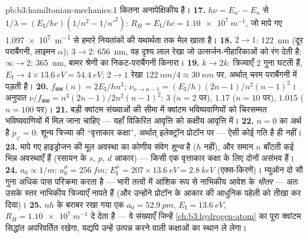 \begin{solution}{pb:b3:hamiltonian-mechanics:1}
कितना अनापेक्षिकीय है।
\textbf{17.} $h\nu = E_{n'} - E_n$ से $1/\lambda =
(E_{\text{I}}/hc)(1/n^2 - 1/n'^2)$: $R_H = E_{\text{I}}/hc =
\qty{1.10e7}{m^{-1}}$, जो मापे गए \qty{1.097e7}{m^{-1}} से हमारे
नियतांकों की यथार्थता तक मेल खाता है।
\textbf{18.} $2 \to 1$: \qty{122}{nm} (दूर पराबैंगनी, लाइमन
$\alpha$); $3 \to 2$: \qty{656}{nm}, वह दृश्य लाल रेखा जो
उत्सर्जन-नीहारिकाओं को रंग देती है; $\infty \to 2$: \qty{365}{nm},
बामर श्रेणी का निकट-पराबैंगनी किनारा।
\textbf{19.} $k \to 2k$: त्रिज्याएँ $2$ गुना घटती हैं, $E_{\text{I}} \to
4 \times \qty{13.6}{eV} = \qty{54.4}{eV}$; $2 \to 1$ रेखा
$\qty{122}{nm}/4 \approx \qty{30}{nm}$ पर, अर्थात् चरम पराबैंगनी में पड़ती है।
\textbf{20.} $f_{\text{कक्ष}}(n) = 2E_{\text{I}}/hn^3$;
$\nu_{n \to n-1} = (E_{\text{I}}/h)(2n - 1)/n^2(n-1)^2$। अनुपात
$\nu/f_{\text{कक्ष}} = n^3(2n-1)/2n^2(n-1)^2$: $3$ ($n = 2$ पर), $1.17$
($n = 10$ पर), $1.015$ ($n = 100$ पर)।
\textbf{21.} बड़ी क्वांटम संख्याओं की सीमा में क्वांटम भविष्यवाणियों
को चिरसम्मत भविष्यवाणियों में मिल जाना चाहिए --- यहाँ विकिरित
आवृत्ति को कक्षीय आवृत्ति में।
\textbf{22.} $n = 0$ का अर्थ है $p_\varphi = 0$: शून्य त्रिज्या की
``वृत्ताकार कक्षा'', अर्थात् इलेक्ट्रॉन प्रोटॉन पर --- ऐसी कोई गति है ही नहीं।
\textbf{23.} मापे गए हाइड्रोजन की मूल अवस्था का कोणीय संवेग
\emph{शून्य} है ($\hbar$ नहीं), और समान $n$ बाँटती कई भिन्न अवस्थाएँ हैं
(रसायन के $s$, $p$, $d$ आकार) --- किसी एक वृत्ताकार कक्षा के लिए
दोनों असंभव हैं।
\textbf{24.} $a_0 \propto 1/m$: $a_0^\mu = \qty{256}{fm}$;
$E_{\text{I}}^\mu = 207 \times \qty{13.6}{eV} = \qty{2.8}{keV}$
(एक्स-किरणें)। म्युऑन दो सौ गुना अधिक पास परिक्रमा करता है --- भारी
तत्वों में आंशिक रूप से नाभिकीय आवेश के \emph{भीतर} --- अतः उसके स्तर
नाभिकीय त्रिज्याएँ नापते हैं (और उन्होंने प्रोटॉन के आकार की आधुनिक
पहेली को तीखा कर दिया)।
\textbf{25.} $nh$ के बराबर रखा गया एक  $a_0 =
\qty{52.9}{pm}$, $E_{\text{I}} = \qty{13.6}{eV}$, $R_H =
\qty{1.10e7}{m^{-1}}$ दे देता है --- वे संख्याएँ जिन्हें
\cref{ch:b3:hydrogen-atom} का पूरा क्वांटम सिद्धांत अपरिवर्तित रखेगा,
यद्यपि उन्हें उत्पन्न करने वाली कक्षाओं का स्थान ले लेगा।
\end{solution}
